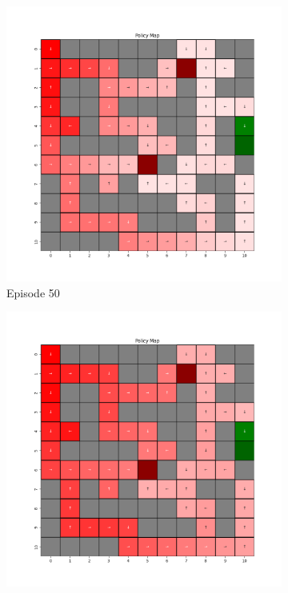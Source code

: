 \documentclass{assignment}
\begin{document}
\begin{figure}[H]
\begin{subfigure}{0.3\textwidth}
        \includegraphics[width=\textwidth]{figures/policy_q/epsilon_sweep/policy_alpha_0.1_gamma_0.95_epsilon_1.0_iteration_50.png}
    \caption{Episode 50}
    \end{subfigure}\hfill
    \begin{subfigure}{0.3\textwidth}
        \includegraphics[width=\textwidth]{figures/policy_q/epsilon_sweep/policy_alpha_0.1_gamma_0.95_epsilon_1.0_iteration_100.png}

\end{subfigure}
\end{figure}
\end{document}

